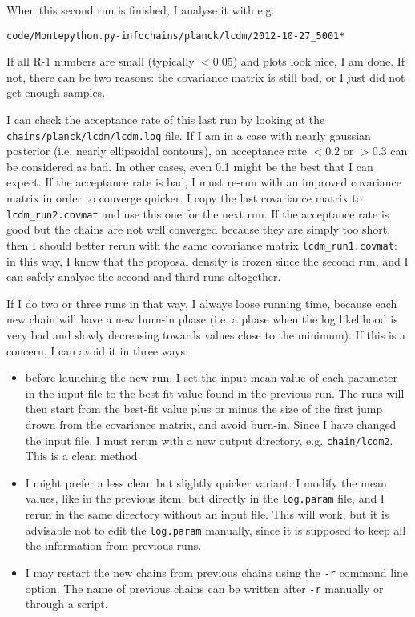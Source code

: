 \documentclass[10pt]{article}
\begin{document}
When this second run is finished, I analyse it with e.g.
\begin{alltt}
code/Montepython.py -info chains/planck/lcdm/2012-10-27_5001*
\end{alltt}
If all R-1 numbers are small (typically $<0.05$) and plots look nice, I am
done. If not, there can be two reasons: the covariance matrix is still bad, or
I just did not get enough samples.

I can check the acceptance rate of this last run by looking at the
\verb?chains/planck/lcdm/lcdm.log? file. If I am in a case with nearly gaussian
posterior (i.e. nearly ellipsoidal contours), an acceptance rate $<0.2$ or
$>0.3$ can be considered as bad. In other cases, even 0.1 might be the best
that I can expect. If the acceptance rate is bad, I must re-run with an
improved covariance matrix in order to converge quicker. I copy the last
covariance matrix to \verb?lcdm_run2.covmat? and use this one for the next run.
If the acceptance rate is good but the chains are not well converged because
they are simply too short, then I should better rerun with the same covariance
matrix \verb?lcdm_run1.covmat?: in this way, I know that the proposal density
is frozen since the second run, and I can safely analyse the second and third
runs altogether.

If I do two or three runs in that way, I always loose running time, because
each new chain will have a new burn-in phase (i.e. a phase when the log
likelihood is very bad and slowly decreasing towards values close to the
minimum). If this is a concern, I can avoid it in three ways:
\begin{itemize}
\item before launching the new run, I set the input mean value of each
  parameter in the input file to the best-fit value found in the previous run.
  The runs will then start from the best-fit value plus or minus the size of
  the first jump drown from the covariance matrix, and avoid burn-in. Since I
  have changed the input file, I must rerun with a new output directory, e.g.
  \verb?chain/lcdm2?. This is a clean method.
\item I might prefer a less clean but slightly quicker variant: I modify the
  mean values, like in the previous item, but directly in the \verb?log.param?
  file, and I rerun in the same directory without an input file. This will
  work, but it is advisable not to edit the \verb?log.param? manually, since it
  is supposed to keep all the information from previous runs.
\item I may restart the new chains from previous chains using the \verb?-r?
  command line option. The name of previous chains can be written after
  \verb?-r? manually or through a script.
\end{itemize}
\end{document}
